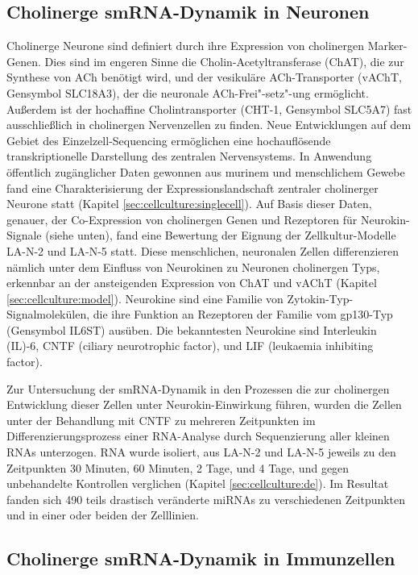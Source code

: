 \subsection{Cholinerge smRNA-Dynamik in Neuronen}
Cholinerge Neurone sind definiert durch ihre Expression von cholinergen Marker-Genen. Dies sind im engeren Sinne die Cholin-Acetyltransferase (ChAT), die zur Synthese von ACh benötigt wird, und der vesikuläre ACh-Transporter (vAChT, Gensymbol SLC18A3), der die neuronale ACh-Frei"-setz"-ung ermöglicht. Außerdem ist der hochaffine Cholintransporter (CHT-1, Gensymbol SLC5A7) fast ausschließlich in cholinergen Nervenzellen zu finden. Neue Entwicklungen auf dem Gebiet des Einzelzell-Sequencing ermöglichen eine hochauflösende transkriptionelle Darstellung des zentralen Nervensystems. In Anwendung öffentlich zugänglicher Daten gewonnen aus murinem und menschlichem Gewebe fand eine Charakterisierung der Expressionslandschaft zentraler cholinerger Neurone statt (Kapitel \ref{sec:cellculture:singlecell}). Auf Basis dieser Daten, genauer, der Co-Expression von cholinergen Genen und Rezeptoren für Neurokin-Signale (siehe unten), fand eine Bewertung der Eignung der Zellkultur-Modelle LA-N-2 und LA-N-5 statt. Diese menschlichen, neuronalen Zellen differenzieren nämlich unter dem Einfluss von Neurokinen zu Neuronen cholinergen Typs, erkennbar an der ansteigenden Expression von ChAT und vAChT (Kapitel \ref{sec:cellculture:model}). Neurokine sind eine Familie von Zytokin-Typ-Signalmolekülen, die ihre Funktion an Rezeptoren der Familie vom gp130-Typ (Gensymbol IL6ST) ausüben. Die bekanntesten Neurokine sind Interleukin (IL)-6, CNTF (ciliary neurotrophic factor), und LIF (leukaemia inhibiting factor).

Zur Untersuchung der smRNA-Dynamik in den Prozessen die zur cholinergen Entwicklung dieser Zellen unter Neurokin-Einwirkung führen, wurden die Zellen unter der Behandlung mit CNTF zu mehreren Zeitpunkten im Differenzierungsprozess einer RNA-Analyse durch Sequenzierung aller kleinen RNAs unterzogen. RNA wurde isoliert, aus LA-N-2 und LA-N-5 jeweils zu den Zeitpunkten 30 Minuten, 60 Minuten, 2 Tage, und 4 Tage, und gegen unbehandelte Kontrollen verglichen (Kapitel \ref{sec:cellculture:de}). Im Resultat fanden sich 490 teils drastisch veränderte miRNAs zu verschiedenen Zeitpunkten und in einer oder beiden der Zelllinien. 

\subsection{Cholinerge smRNA-Dynamik in Immunzellen}


